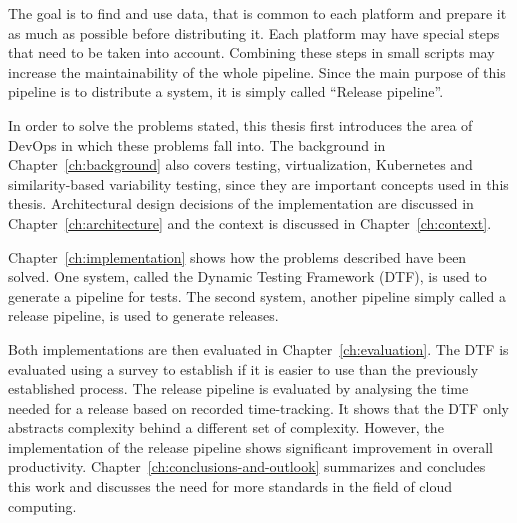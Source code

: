 The goal is to find and use data, that is common to each platform and prepare it as much as possible before distributing it.
Each platform may have special steps that need to be taken into account.
Combining these steps in small scripts may increase the maintainability of the whole pipeline.
Since the main purpose of this pipeline is to distribute a system, it is simply called ``Release pipeline''.

In order to solve the problems stated, this thesis first introduces the area of DevOps in which these problems fall into.
The background in Chapter~\ref{ch:background} also covers testing, virtualization, Kubernetes and similarity-based variability testing, since they are important concepts used in this thesis.
Architectural design decisions of the implementation are discussed in Chapter~\ref{ch:architecture} and the context is discussed in Chapter~\ref{ch:context}.

Chapter~\ref{ch:implementation} shows how the problems described have been solved.
One system, called the Dynamic Testing Framework (DTF), is used to generate a pipeline for tests.
The second system, another pipeline simply called a release pipeline, is used to generate releases.

\pagebreak

Both implementations are then evaluated in Chapter~\ref{ch:evaluation}.
The DTF is evaluated using a survey to establish if it is easier to use than the previously established process.
The release pipeline is evaluated by analysing the time needed for a release based on recorded time-tracking.
It shows that the DTF only abstracts complexity behind a different set of complexity.
However, the implementation of the release pipeline shows significant improvement in overall productivity.
Chapter~\ref{ch:conclusions-and-outlook} summarizes and concludes this work and discusses the need for more standards in the field of cloud computing.

